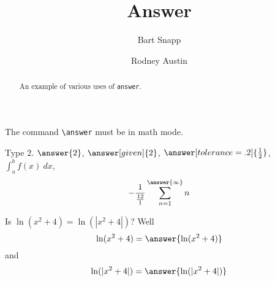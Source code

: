 \documentclass{ximera}
\title{Answer}
\author{Bart Snapp \and Rodney Austin}
\begin{document}
\begin{abstract}
  An example of various uses of \texttt{answer}.
\end{abstract}
\maketitle


The command \verb|\answer| must be in math mode. 


\begin{problem}
  Type $2$. $\answer{2}$, $\answer[given]{2}$, $\answer[tolerance=.2]{\frac{1}{2}}$,  $\int_a^b f(x) \ dx$,
  \[
  -\frac{1}{\frac{12}{1}}\sum_{n=1}^{\answer{\infty}} n
  \]
\end{problem}


\begin{problem}
  Is $\ln(x^2+4) = \ln(|x^2+4|)$? Well
  \[
  \ln(x^2+4) = \answer{ \ln(x^2+4) }
  \]
  and
  \[
  \ln(|x^2+4|) = \answer{ \ln(|x^2+4|) }
  \]
\end{problem}
\end{document}

